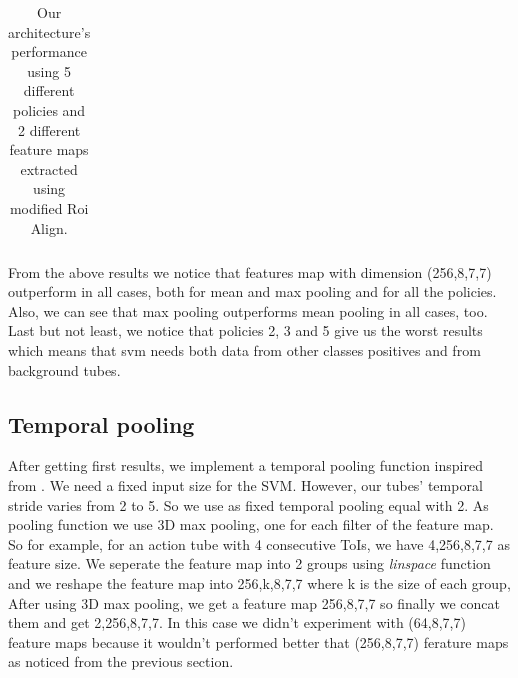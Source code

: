 \documentclass{report}
\begin{document}
\begin{center}
\begin{longtable}{||c | c | c| c||c c c||}
  \caption{Our architecture's performance using 5 different policies and 2 different feature maps extracted using modified Roi Align.}
  \label{table:svm_mod_roialign}

\end{longtable} 
\end{center}

From the above results we notice that features map with dimension (256,8,7,7) outperform in all cases, both for mean and max pooling and
for all the policies. Also, we can see that max pooling outperforms mean pooling in all cases, too. Last but not least, we notice that policies
2, 3 and 5 give us the worst results which means that svm needs both data from other classes positives and from background tubes. 

\subsection{Temporal pooling}
After getting first results, we implement a temporal pooling function inspired from \cite{DBLP:journals/corr/HouCS17}. We need a
fixed input size for the SVM. However, our tubes' temporal stride varies from 2 to 5. So we use as fixed temporal pooling equal
with 2. As pooling function we use 3D max pooling, one for each filter of the feature map.  So for example, for an action tube
with 4 consecutive ToIs, we  have 4,256,8,7,7 as feature size. We seperate the feature map into 2 groups using \textit{linspace}
function and we reshape the feature map into 256,k,8,7,7 where k is the size of each group, After using 3D max pooling, we get
a feature map 256,8,7,7 so finally we concat them and get 2,256,8,7,7. In this case we didn't experiment with (64,8,7,7) feature
maps because it wouldn't performed better that (256,8,7,7) ferature maps as noticed from the previous section.
\end{document}
